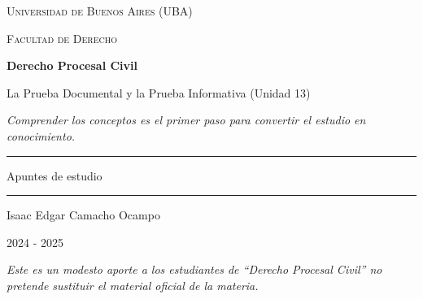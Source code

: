 \documentclass[12pt,oneside]{book}
\newcommand{\universidad}{Universidad de Buenos Aires (UBA)}
\newcommand{\facultad}{Facultad de Derecho}
\newcommand{\materia}{Derecho Procesal Civil}
\newcommand{\titulo}{La Prueba Documental y la Prueba Informativa (Unidad 13)}
\newcommand{\autor}{Isaac Edgar Camacho Ocampo}
\newcommand{\anio}{2024 - 2025}
\begin{document}
\begin{titlepage}

\thispagestyle{empty}

\begin{center}

\vspace*{1cm}

{\large \textsc{\universidad}}

\vspace{0.2cm}

{\large \textsc{\facultad}}

\vspace{3cm}

{\Huge \textbf{\materia}}

\vspace{1cm}

{\LARGE \titulo}

\vspace{0.8cm}

\textit{Comprender los conceptos es el primer paso para convertir el estudio en conocimiento.}

\vspace{1.2cm}

\rule{0.70\textwidth}{0.5pt}

\vspace{0.5cm}

{\large Apuntes de estudio}

\vspace{0.5cm}

\rule{0.70\textwidth}{0.5pt}

\vfill

{\large \autor}

\vspace{0.3cm}

{\large \anio}

\end{center}

\vfill

\begin{flushleft}
\textit{Este es un modesto aporte a los estudiantes de ``Derecho Procesal Civil'' no pretende sustituir el material oficial de la materia.}
\end{flushleft}

\end{titlepage}

\tableofcontents
\end{document}
